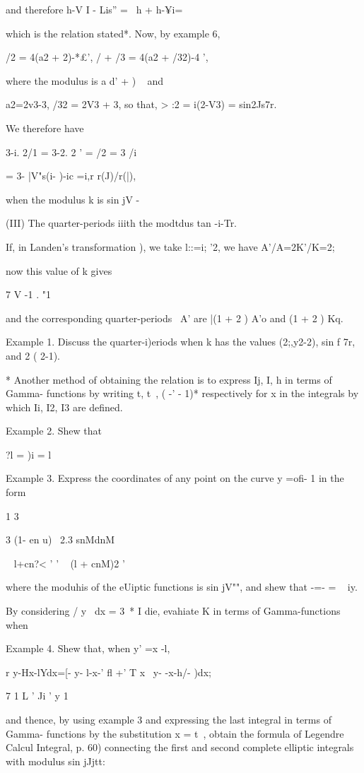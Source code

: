 and therefore h-V I - Lis'' = \ h + h-¥i=

which is the relation stated*. Now, by example 6,

/2 = 4(a2 + 2)-*£', / + /3 = 4(a2 + /32)-4 ',

where the modulus is a d' + ) ~ and

a2=2v3-3, /32 = 2V3 + 3, so that, > :2 = i(2-V3) = sin2Js7r.

We therefore have

3-i. 2/1 = 3-2. 2 ' = /2 = 3 /i

= 3- |V"s(i- )-ic =i,r r(J)/r(|),

when the modulus k is sin jV -

(III) The quarter-periods iiith the modtdus tan -i-Tr.

If, in Landen's transformation ), we take l::=i; '2, we have
A'/A=2K'/K=2;

now this value of k gives

7 V -1 . "1

and the corresponding quarter-periods \, A' are |(1 + 2 ) A'o and (1 +
2 ) Kq.

Example 1. Discuss the quarter-i)eriods when k has the values
(2;,y2-2), sin f 7r, and 2 ( 2-1).

* Another method of obtaining the relation is to express Ij, I, h in
terms of Gamma- functions by writing t, t~, ( -' - 1)* respectively
for x in the integrals by which Ii, I2, I3 are defined.

%
%

Example 2. Shew that

?l = )i = l

Example 3. Express the coordinates of any
point on the curve y =ofi- 1 in the form

1 3

3 (1- en u) \ 2.3 snMdnM

 ~ l+cn?< ' ' ~ (l + cnM)2 '

where the moduhis of the eUiptic functions is sin jV"", and shew that
-=- = ~ iy.

By considering / y~ dx = 3~* I die, evahiate K in terms of
Gamma-functions when

Example 4. Shew that, when y' =x -l,

r y-Hx-lYdx=[- y- l-x-' fl +' T x~ y- -x-h/- )dx;

7 1 L ' Ji ' y 1

and thence, by using example 3 and expressing the last integral in
terms of Gamma- functions by the substitution x = t~, obtain the
formula of Legendre Calcul Integral, p. 60) connecting the first and
second complete elliptic integrals with modulus sin jJjtt:

